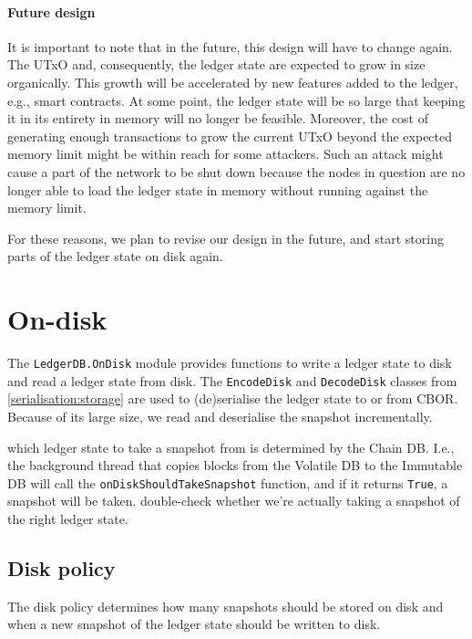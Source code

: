 \paragraph{Future design}

It is important to note that in the future, this design will have to change
again. The UTxO and, consequently, the ledger state are expected to grow in size
organically. This growth will be accelerated by new features added to the
ledger, e.g., smart contracts. At some point, the ledger state will be so large
that keeping it in its entirety in memory will no longer be feasible. Moreover,
the cost of generating enough transactions to grow the current UTxO beyond the
expected memory limit might be within reach for some attackers. Such an attack
might cause a part of the network to be shut down because the nodes in question
are no longer able to load the ledger state in memory without running against
the memory limit.

For these reasons, we plan to revise our design in the future, and start storing
parts of the ledger state on disk again.

\section{On-disk}
\label{ledgerdb:on-disk}

The \lstinline!LedgerDB.OnDisk! module provides functions to write a ledger
state to disk and read a ledger state from disk. The \lstinline!EncodeDisk! and
\lstinline!DecodeDisk! classes from \cref{serialisation:storage} are used to
(de)serialise the ledger state to or from CBOR. Because of its large size, we
read and deserialise the snapshot incrementally.

 which ledger state to take a snapshot from is determined by the
Chain DB. I.e., the background thread that copies blocks from the Volatile DB to
the Immutable DB will call the \lstinline!onDiskShouldTakeSnapshot! function,
and if it returns \lstinline!True!, a snapshot will be taken. 
double-check whether we're actually taking a snapshot of the right ledger state.

\subsection{Disk policy}
\label{ledgerdb:on-disk:disk-policy}

The disk policy determines how many snapshots should be stored on disk and when
a new snapshot of the ledger state should be written to disk.

